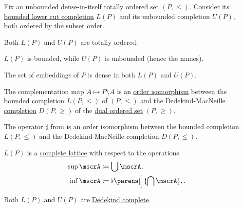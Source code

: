 \begin{theorem}\label{thm:unbounded_lower_cut_completion}
  Fix an \hyperref[def:extremal_points/bounds]{unbounded} \hyperref[def:dense_total_order]{dense-in-itself} \hyperref[def:totally_ordered_set]{totally ordered set} \( (P, \leq) \). Consider its \hyperref[def:lower_cut_completion]{bounded lower cut completion} \( L(P) \) and its unbounded completion \( U(P) \), both ordered by the subset order.

  \begin{thmenum}
     Both \( L(P) \) and \( U(P) \) are totally ordered.

     \( L(P) \) is bounded, while \( U(P) \) is unbounded (hence the names).

     The set of embeddings of \( P \) is dense in both \( L(P) \) and \( U(P) \).

     The complementation map \( A \mapsto P \setminus A \) is an \hyperref[def:preordered_set/homomorphism]{order isomorphism} between the bounded completion \( L(P, \leq) \) of \( (P, \leq) \) and the \hyperref[def:dedekind_macnielle_completion]{Dedekind-MacNeille completion} \( D(P, \geq) \) of the \hyperref[def:preordered_set/opposite]{dual ordered set} \( (P, \geq) \).

     The operator \( \sharp \) from  is an order isomorphism between the bounded completion \( L(P, \leq) \) and the Dedekind-MacNeille completion \( D(P, \leq) \).

     \( L(P) \) is a \hyperref[def:complete_lattice]{complete lattice} with respect to the operations
    \begin{align}
      \sup \mscrA &\coloneqq \bigcup \mscrA,                       \label{eq:thm:unbounded_lower_cut_completion/lattice/join} \\
      \inf \mscrA &\coloneqq \flat\parens[\Big]{ \bigcap \mscrA }, \label{eq:thm:unbounded_lower_cut_completion/lattice/meet}.
    \end{align}

     Both \( L(P) \) and \( U(P) \) are \hyperref[def:dedekind_completeness]{Dedekind complete}.
  \end{thmenum}
\end{theorem}

